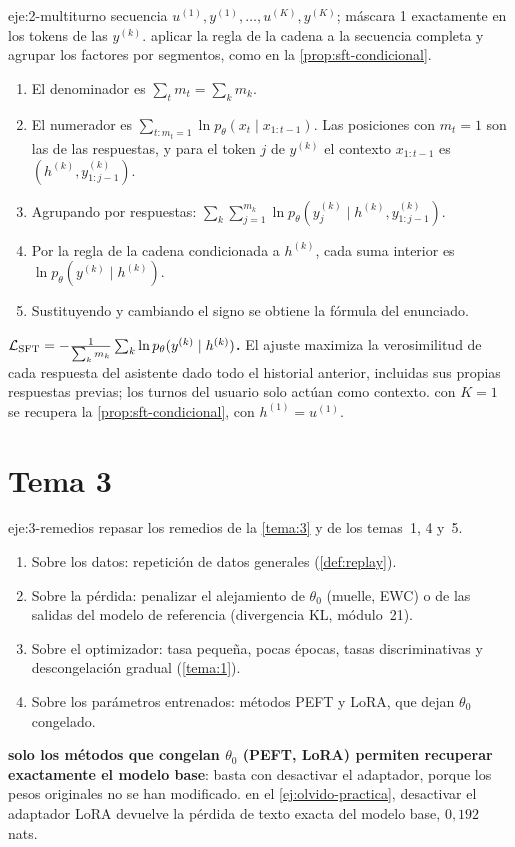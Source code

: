 \begin{solucion}{eje:2-multiturno}
\datos secuencia $u^{(1)},y^{(1)},\dots,u^{(K)},y^{(K)}$; máscara 1 exactamente en los tokens de las $y^{(k)}$.
\planteamiento aplicar la regla de la cadena a la secuencia completa y agrupar los factores por segmentos, como en la \cref{prop:sft-condicional}.
\pasos
\begin{enumerate}[label=\arabic*.]
  \item El denominador es $\sum_tm_t=\sum_km_k$.
  \item El numerador es $\sum_{t:m_t=1}\ln p_\theta(x_t\mid x_{1:t-1})$. Las posiciones con $m_t=1$ son las de las respuestas, y para el token $j$ de $y^{(k)}$ el contexto $x_{1:t-1}$ es $(h^{(k)},y^{(k)}_{1:j-1})$.
  \item Agrupando por respuestas: $\sum_k\sum_{j=1}^{m_k}\ln p_\theta(y^{(k)}_j\mid h^{(k)},y^{(k)}_{1:j-1})$.
  \item Por la regla de la cadena condicionada a $h^{(k)}$, cada suma interior es $\ln p_\theta(y^{(k)}\mid h^{(k)})$.
  \item Sustituyendo y cambiando el signo se obtiene la fórmula del enunciado.
\end{enumerate}
\resultado \textbf{$\mathcal{L}_{\mathrm{SFT}}=-\frac{1}{\sum_km_k}\sum_k\ln p_\theta(y^{(k)}\mid h^{(k)})$.} El ajuste maximiza la verosimilitud de cada respuesta del asistente dado todo el historial anterior, incluidas sus propias respuestas previas; los turnos del usuario solo actúan como contexto.
\comprobacion con $K=1$ se recupera la \cref{prop:sft-condicional}, con $h^{(1)}=u^{(1)}$.
\end{solucion}

\section{Tema 3}

\begin{solucion}{eje:3-remedios}
\planteamiento repasar los remedios de la \cref{tema:3} y de los temas~1, 4 y~5.
\pasos
\begin{enumerate}[label=\arabic*.]
  \item Sobre los datos: repetición de datos generales (\cref{def:replay}).
  \item Sobre la pérdida: penalizar el alejamiento de $\theta_0$ (muelle, EWC) o de las salidas del modelo de referencia (divergencia KL, módulo~21).
  \item Sobre el optimizador: tasa pequeña, pocas épocas, tasas discriminativas y descongelación gradual (\cref{tema:1}).
  \item Sobre los parámetros entrenados: métodos PEFT y LoRA, que dejan $\theta_0$ congelado.
\end{enumerate}
\resultado \textbf{solo los métodos que congelan $\theta_0$ (PEFT, LoRA) permiten recuperar exactamente el modelo base}: basta con desactivar el adaptador, porque los pesos originales no se han modificado.
\comprobacion en el \cref{ej:olvido-practica}, desactivar el adaptador LoRA devuelve la pérdida de texto exacta del modelo base, $0{,}192$ nats.
\end{solucion}

